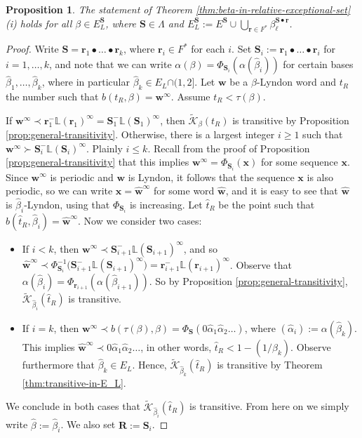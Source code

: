 \documentclass[11pt]{amsart}
\newtheorem{proposition}[theorem]{Proposition}
\theoremstyle{definition}
\theoremstyle{remark}
\numberwithin{equation}{section}
\renewcommand{\L}{\ensuremath{\mathbb{L}}}
\newcommand{\F}{F^*}
\newcommand{\Kt}{\widetilde{\mathcal{K}}}
\newcommand{\bR}{\mathbf{R}}
\newcommand{\cs}{ {\mathbf{S}}}
\renewcommand{\r}{ {\mathbf{r}}}
\newcommand{\w}{\mathbf{w}}
\newcommand{\f}{\infty}
\newcommand{\al}{\alpha}
\newcommand{\La}{\Lambda}
\begin{document}
\begin{proposition} \label{prop:transitive-subshifts}
The statement of Theorem \ref{thm:beta-in-relative-exceptional-set} (i) holds for all $\beta\in E_L^\cs$, where $\cs\in\La$ and
$E_L^\cs:=E^\cs\cup\bigcup_{\r\in\F}\beta_\ell^{\cs\bullet\r}$.
\end{proposition}

\begin{proof}%
Write $\cs=\r_1\bullet\dots\bullet \r_k$, where $\r_i\in\F$ for each $i$. Set $\cs_i:=\r_1\bullet\dots\bullet\r_i$ for $i=1,\dots,k$, and note that we can write $\al(\beta)=\Phi_{\cs_i}(\al(\hat{\beta}_i))$ for certain bases $\hat{\beta}_1,\dots,\hat{\beta}_k$, where in particular $\hat{\beta}_k\in E_L{\cap(1,2]}$. Let $\w$ be a $\beta$-Lyndon word and $t_R$ the number such that $b(t_R,\beta)=\w^\f$. {Assume $t_R<\tau(\beta)$.}

If $\w^\f\prec {\r_1^-}\L(\r_1)^\f={\cs_1^-}\L(\cs_1)^\f$, then $\Kt_\beta(t_R)$ is transitive by Proposition \ref{prop:general-transitivity}. Otherwise, there is a {largest} integer $i\geq 1$ such that $\w^\f\succ {\cs_i^-}\L(\cs_i)^\f$. Plainly $i\leq k$. Recall from the proof of Proposition \ref{prop:general-transitivity} that this implies $\w^\f=\Phi_{\cs_i}(\mathbf{x})$ for some sequence $\mathbf{x}$. Since $\w^\f$ is periodic and $\w$ {is Lyndon}, it follows that the sequence $\mathbf{x}$ is also periodic, so we can write $\mathbf{x}=\hat{\w}^\f$ for some word $\hat{\w}$, and it is easy to see that $\hat{\w}$ is $\hat{\beta}_i$-Lyndon, using that $\Phi_{\cs_i}$ is increasing. Let $\hat{t}_R$ be the point such that $b(\hat{t}_R,\hat{\beta}_i)=\hat{\w}^\f$. Now we consider two cases:
\begin{itemize}
\item If $i<k$, then $\w^\f\prec \cs_{i+1}^-\L(\cs_{i+1})^\f$, and so $\hat{\w}^\f\prec \Phi_{\cs_i}^{-1}\big(\cs_{i+1}^-\L(\cs_{i+1})^\f\big)=\r_{i+1}^-\L(\r_{i+1})^\f$. Observe that $\al(\hat{\beta}_i)=\Phi_{\r_{i+1}}(\al(\hat{\beta}_{i+1}))$. So by Proposition \ref{prop:general-transitivity}, $\Kt_{\hat\beta_i}(\hat{t}_R)$ is transitive.
\item If $i=k$, then $\w^\f\prec {b(\tau(\beta),\beta)}=\Phi_\cs(0\hat{\al}_1\hat{\al}_2\dots)$, where $(\hat{\al}_i):=\al(\hat{\beta}_k)$. This implies $\hat{\w}^\f\prec 0\hat{\al}_1\hat{\al}_2\dots$, in other words, $\hat{t}_R<1-(1/\hat{\beta}_k)$. Observe furthermore that $\hat{\beta}_k\in E_L$. Hence, $\Kt_{\hat\beta_k}(\hat{t}_R)$ is transitive by Theorem \ref{thm:transitive-in-E_L}.
\end{itemize}
We conclude in both cases that $\Kt_{\hat\beta_i}(\hat{t}_R)$ is transitive. From here on we simply write $\hat{\beta}:=\hat{\beta}_i$. We also set $\bR:=\cs_i$.


\end{proof}
\end{document}
